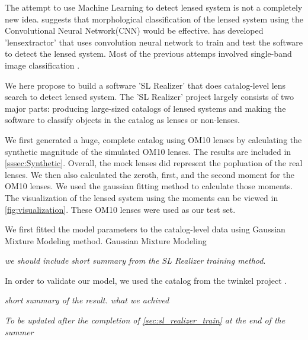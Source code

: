 \documentclass[\docopts]{\docclass}
\begin{document}
The attempt to use Machine Learning to detect lensed system is not a completely new idea. \citep{convolution_neural_network} suggests that morphological classification of the lensed system using the Convolutional Neural Network(CNN) would be effective. \citep{LensExtractor} has developed 'lensextractor' that uses convolution neural network to train and test the software to detect the lensed system. Most of the previous attemps involved single-band image classification \cite{LensExtractor} \cite{convolution_neural_network}.

We here propose to build a software 'SL Realizer' that does catalog-level lens search to detect lensed system. The 'SL Realizer' project largely consists of two major parts: producing large-sized catalogs of lensed systems and making the software to classify objects in the catalog as lenses or non-lenses. 

We first generated a huge, complete catalog using OM10 lenses \citep{OM10} by calculating the synthetic magnitude of the simulated OM10 lenses. The results are included in \ref{sssec:Synthetic}. Overall, the mock lenses did represent the popluation of the real lenses. We then also calculated the zeroth, first, and the second moment for the OM10 lenses. We used the gaussian fitting method to calculate those moments. The visualization of the lensed system using the moments can be viewed in \ref{fig:visualization}. These OM10 lenses were used as our test set.

We first fitted the model parameters to the catalog-level data using Gaussian Mixture Modeling method. Gaussian Mixture Modeling 

\textit{we should include short summary from the SL Realizer training method}.

In order to validate our model, we used the catalog from the twinkel project \cite{Twinkles}.

\textit{short summary of the result. what we achived}
 
\textit{To be updated after the completion of \ref{sec:sl_realizer_train} at the end of the summer}



\end{document}
